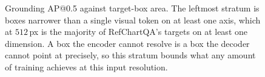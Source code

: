 \begin{figure}[t]
\centering
\caption{Grounding AP@0.5 against target-box area. The leftmost stratum is boxes narrower than a single visual token on at least one axis, which at $512$\,px is the majority of RefChartQA's targets on at least one dimension. A box the encoder cannot resolve is a box the decoder cannot point at precisely, so this stratum bounds what any amount of training achieves at this input resolution.}
\label{fig:ap_by_area}
\end{figure}

